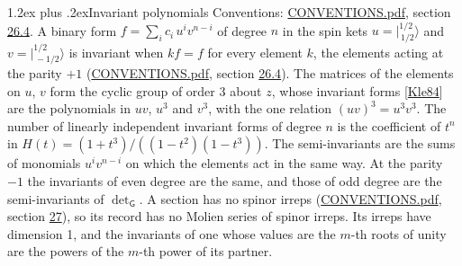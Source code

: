 \documentclass[10pt,a4paper]{article}
\makeatletter
\renewcommand\section{\@startsection{section}{1}{\z@}{-3ex plus -1ex minus -.2ex}%
  {1.2ex plus .2ex}{\normalfont\large\sffamily\bfseries\color{parttitle}}}
\numberwithin{equation}{section}
\newcommand{\grp}[1]{\mathsf{#1}}
\newcommand{\jm}[2]{\bigl\lvert{}^{#1}_{\,#2}\bigr\rangle}
\makeatother
\begin{document}
\section{Invariant polynomials}\label{s:invariants}
Conventions: \href{../../CONVENTIONS.pdf}{CONVENTIONS.pdf}, section \href{../../CONVENTIONS.pdf\#conv.26.4}{26.4}.
\leavevmode\label{n:local.spinor.uv}\label{n:local.binary.form}A binary form $f = \sum_i c_i\, u^i v^{n-i}$ of degree $n$ in the spin kets $u = \jm{1/2}{1/2}$ and $v = \jm{1/2}{-1/2}$ is invariant when $k f = f$ for every element $k$, the elements acting at the parity $+1$ (\href{../../CONVENTIONS.pdf}{CONVENTIONS.pdf}, section \href{../../CONVENTIONS.pdf\#conv.26.4}{26.4}).
The matrices of the elements on $u$, $v$ form the cyclic group of order 3 about $z$, whose invariant forms [\href{../../../REFERENCES.pdf\#ref.Kle84}{Kle84}] are the polynomials in $uv$, $u^{3}$ and $v^{3}$, with the one relation $(uv)^{3} = u^{3}v^{3}$. \label{n:function.hilbert}The number of linearly independent invariant forms of degree $n$ is the coefficient of $t^n$ in $H(t) = (1 + t^{3})/((1-t^{2})(1-t^{3}))$. The semi-invariants are the sums of monomials $u^i v^{n-i}$ on which the elements act in the same way. At the parity $-1$ the invariants of even degree are the same, and those of odd degree are the semi-invariants of $\det_{\grp{G}}$. A section has no spinor irreps (\href{../../CONVENTIONS.pdf}{CONVENTIONS.pdf}, section \href{../../CONVENTIONS.pdf\#conv.27}{27}), so its record has no Molien series of spinor irreps. Its irreps have dimension 1, and the invariants of one whose values are the $m$-th roots of unity are the powers of the $m$-th power of its partner.
\end{document}
